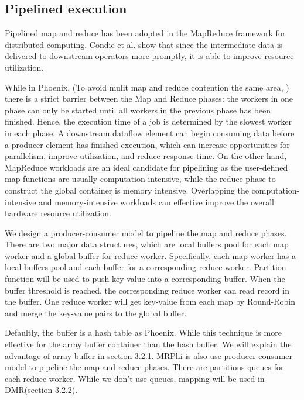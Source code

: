 \subsection{Pipelined execution}
Pipelined map and reduce has been adopted 
in the MapReduce framework for distributed computing\cite{Condie2010MapReduce,}. 
Condie et al. show that since the intermediate data is delivered to
downstream operators more promptly, 
it is able to improve resource utilization.

While in Phoenix, (To avoid mulit map and reduce contention the same area, )
there is a strict barrier between the Map and Reduce phases: 
the workers in one phase can only be started 
until all workers in the previous phase has been finished. 
Hence, the execution time of a job is determined by the
slowest worker in each phase. 
A downstream dataflow element can begin consuming data
before a producer element has finished execution, which can
increase opportunities for parallelism, improve utilization,
and reduce response time.
On the other hand, MapReduce workloads
are an ideal candidate for pipelining as the user-defined
map functions are usually computation-intensive, while the
reduce phase to construct the global container is memory
intensive\cite{talbot2011phoenix++}.
Overlapping the
computation-intensive and memory-intensive workloads 
can effective improve the overall hardware resource utilization.

We design a producer-consumer model to pipeline the
map and reduce phases.
There are two major data structures,
which are local buffers pool for each map worker and 
a global buffer for reduce worker.
Specifically, 
each map worker has a local buffers pool and 
each buffer for a corresponding reduce worker.
Partition function will be used to push key-value into a corresponding
buffer.
When the buffer threshold is reached,
the corresponding reduce worker can read record in the buffer.
One reduce worker will get key-value from each map by Round-Robin and 
merge the key-value pairs to the global buffer.


Defaultly, the buffer is a hash table as Phoenix.
While this technique is more effective for the array buffer
container than the hash buffer. 
We will explain the advantage of array buffer in section 3.2.1.
MRPhi\cite{lu2013mrphi} is also use producer-consumer model to 
pipeline the map and reduce phases. 
There are partitions queues for each reduce worker.
While we don't use queues, mapping will be used in DMR(section 3.2.2).

